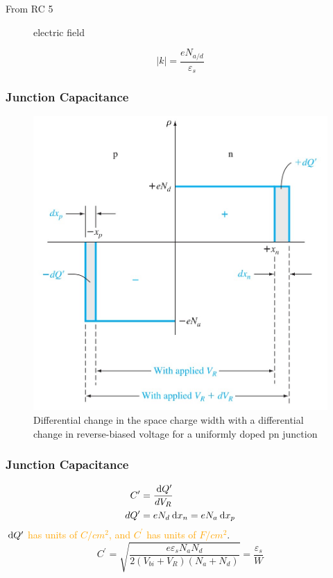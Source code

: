 \documentclass{beamer}
\begin{document}
\begin{frame}{From RC 5}
\begin{minipage}{\linewidth}
\begin{minipage}[b]{0.49\linewidth}
\begin{figure}[H]
                    \caption{electric field}
                    \label{fig:pn-junction-electric-field.jpg}
                \end{figure}
                \begin{equation*}
                    |k| = \frac{e N_{a/d}}{\varepsilon_s} 
                \end{equation*}
            \end{minipage}
        \end{minipage}
    \end{frame}

    \begin{frame} \frametitle{Junction Capacitance}
        \begin{figure}[H]
            \centering
            \includegraphics[width=0.6\linewidth]{Junction-capacitance.jpg}
            \caption{Differential change in the space charge width with a differential change in reverse-biased voltage for a uniformly doped pn junction}
            \label{fig:Junction-capacitance.jpg}
        \end{figure}
    \end{frame}

    \begin{frame} \frametitle{Junction Capacitance}
        \begin{equation*}
            \begin{aligned}
                C^\prime &= \frac{\: \mathrm{d} Q^\prime}{d V_R} \\
                d Q^\prime &= e N_d \: \mathrm{d} x_n = e N_a \: \mathrm{d} x_p
            \end{aligned}
        \end{equation*}
        \textcolor{orange}{$\: \mathrm{d} Q^\prime$ has units of $C/cm^2$, and $C^\prime$ has units of $F/cm^2$}.
        \begin{equation*}
            \boxed{C^\prime = \sqrt{\frac{e \varepsilon_s N_a N_d}{2 (V_{bi} + V_R) (N_a + N_d)} } = \frac{\varepsilon_s}{W} }
        \end{equation*}
    \end{frame}
\end{document}
